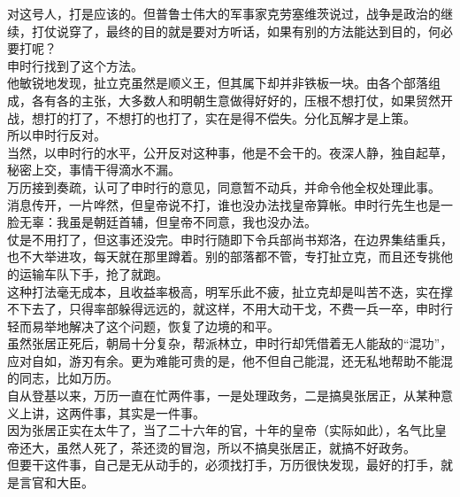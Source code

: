 \begin{multicols}{\theparacolNo}
对这号人，打是应该的。但普鲁士伟大的军事家克劳塞维茨说过，战争是政治的继续，打仗说穿了，最终的目的就是要对方听话，如果有别的方法能达到目的，何必要打呢？\\

申时行找到了这个方法。\\

他敏锐地发现，扯立克虽然是顺义王，但其属下却并非铁板一块。由各个部落组成，各有各的主张，大多数人和明朝生意做得好好的，压根不想打仗，如果贸然开战，想打的打了，不想打的也打了，实在是得不偿失。分化瓦解才是上策。\\

所以申时行反对。\\

当然，以申时行的水平，公开反对这种事，他是不会干的。夜深人静，独自起草，秘密上交，事情干得滴水不漏。\\

万历接到奏疏，认可了申时行的意见，同意暂不动兵，并命令他全权处理此事。\\

消息传开，一片哗然，但皇帝说不打，谁也没办法找皇帝算帐。申时行先生也是一脸无辜：我虽是朝廷首辅，但皇帝不同意，我也没办法。\\

仗是不用打了，但这事还没完。申时行随即下令兵部尚书郑洛，在边界集结重兵，也不大举进攻，每天就在那里蹲着。别的部落都不管，专打扯立克，而且还专挑他的运输车队下手，抢了就跑。\\

这种打法毫无成本，且收益率极高，明军乐此不疲，扯立克却是叫苦不迭，实在撑不下去了，只得率部躲得远远的，就这样，不用大动干戈，不费一兵一卒，申时行轻而易举地解决了这个问题，恢复了边境的和平。\\

虽然张居正死后，朝局十分复杂，帮派林立，申时行却凭借着无人能敌的“混功”，应对自如，游刃有余。更为难能可贵的是，他不但自己能混，还无私地帮助不能混的同志，比如万历。\\

自从登基以来，万历一直在忙两件事，一是处理政务，二是搞臭张居正，从某种意义上讲，这两件事，其实是一件事。\\

因为张居正实在太牛了，当了二十六年的官，十年的皇帝（实际如此），名气比皇帝还大，虽然人死了，茶还烫的冒泡，所以不搞臭张居正，就搞不好政务。\\

但要干这件事，自己是无从动手的，必须找打手，万历很快发现，最好的打手，就是言官和大臣。\\


\end{multicols}
